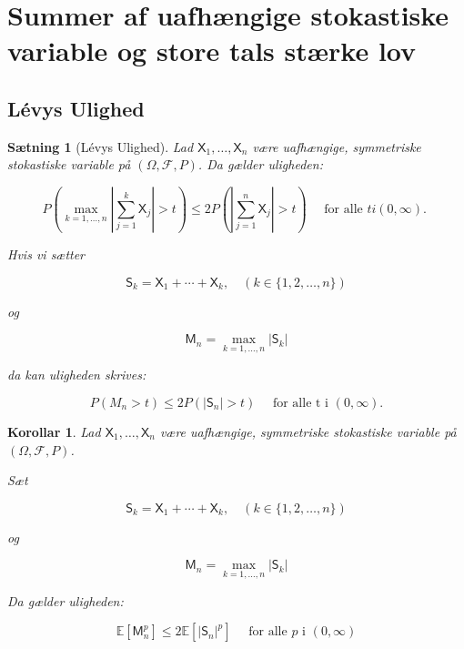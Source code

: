 \documentclass{article}
\newcommand{\1}{\mathbbm{1}}
\theoremstyle{boxed}
\newtheorem{corollary}[theorem]{Korollar}
\newtheorem{proposition}[theorem]{Sætning}
\begin{document}
\section{Summer af uafhængige stokastiske variable og store tals stærke lov}
\subsection{Lévys Ulighed}
\begin{theorem-box}
    \begin{proposition}[Lévys Ulighed]
        Lad $\mathsf{X}_1, \ldots, \mathsf{X}_n$ være uafhængige, symmetriske stokastiske variable på $(\Omega, \mathcal{F}, P)$. Da gælder uligheden:

$$
P\left(\max _{k=1, \ldots, n}\left|\sum_{j=1}^k \mathsf{X}_j\right|>t\right) \leq 2 P\left(\left|\sum_{j=1}^n \mathsf{X}_j\right|>t\right) \quad \text { for alle } t i(0, \infty) \text {. }
$$


Hvis vi sætter

$$
\mathsf{S}_k=\mathsf{X}_1+\cdots+\mathsf{X}_k, \quad(k \in\{1,2, \ldots, n\})
$$

og

$$
\mathsf{M}_n=\max _{k=1, \ldots, n}\left|\mathsf{S}_k\right|
$$

da kan uligheden skrives:

$$
P\left(M_n>t\right) \leq 2 P\left(\left|\mathsf{S}_n\right|>t\right) \quad \text { for alle t i } (0, \infty) .
$$

    \end{proposition}
\end{theorem-box}
\begin{theorem-box}
    \begin{corollary}
        Lad $\mathsf{X}_1, \ldots, \mathsf{X}_n$ være uafhængige, symmetriske stokastiske variable på $(\Omega, \mathcal{F}, P)$.

Sæt

$$
\mathsf{S}_k=\mathsf{X}_1+\cdots+\mathsf{X}_k, \quad(k \in\{1,2, \ldots, n\})
$$

og

$$
\mathsf{M}_n=\max _{k=1, \ldots, n}\left|\mathsf{S}_k\right|
$$


Da gælder uligheden:

$$
\mathbb{E}\left[\mathsf{M}_n^p\right] \leq 2 \mathbb{E}\left[\left|\mathsf{S}_n\right|^p\right] \quad \text { for alle } p \text { i }(0, \infty)
$$

    \end{corollary}
\end{theorem-box}
\end{document}
